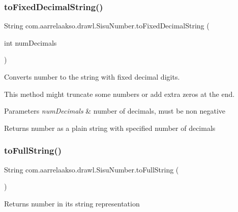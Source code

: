 \subsubsection{\texorpdfstring{to\+Fixed\+Decimal\+String()}{toFixedDecimalString()}}
{\footnotesize\ttfamily String com.\+aarrelaakso.\+drawl.\+Sisu\+Number.\+to\+Fixed\+Decimal\+String (\begin{DoxyParamCaption}\item[{int}]{num\+Decimals }\end{DoxyParamCaption})\hspace{0.3cm}{\ttfamily [protected]}}



Converts number to the string with fixed decimal digits. 

This method might truncate some numbers or add extra zeros at the end.


\begin{DoxyParams}{Parameters}
{\em num\+Decimals} & number of decimals, must be non negative \\
\hline
\end{DoxyParams}
\begin{DoxyReturn}{Returns}
number as a plain string with specified number of decimals 
\end{DoxyReturn}
\mbox{\label{classcom_1_1aarrelaakso_1_1drawl_1_1_sisu_number_af92a070f5f79dbd684b2c1b8cf423c6f}} 
\subsubsection{\texorpdfstring{to\+Full\+String()}{toFullString()}}
{\footnotesize\ttfamily String com.\+aarrelaakso.\+drawl.\+Sisu\+Number.\+to\+Full\+String (\begin{DoxyParamCaption}{ }\end{DoxyParamCaption})\hspace{0.3cm}{\ttfamily [protected]}}

\begin{DoxyReturn}{Returns}
number in it\textquotesingle{}s string representation 
\end{DoxyReturn}
\mbox{\label{classcom_1_1aarrelaakso_1_1drawl_1_1_sisu_number_af5251e6a7d1f5ed6762394384f2ec604}} 
